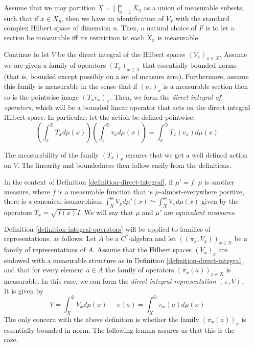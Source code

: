 \begin{example}
\label{example-measurable-Hilbert}
Assume that we may partition $X=\bigsqcup_{n=1}^{\omega} X_n$ as a union of measurable subsets, such that if $x\in X_n$, then we have an identification of $V_x$ with the standard complex Hilbert space of dimension $n$. Then, a natural choice of $F$ is to let a section be measurable iff its restriction to each $X_n$ is measurable.
\end{example}




\begin{definition} 
\label{definition-integral-operators}
Continue to let $V$ be the direct integral of the Hilbert spaces $(V_x)_{x\in X}$. Assume we are given a family of operators $(T_x)_{x\in X}$ that essentially bounded norms (that is, bounded except possibly on a set of measure zero). Furthermore, assume this family is measurable in the sense that if $(v_x)_x$ is a measurable section then so is the pointwise image $(T_xv_x)_x$. Then, we form the {\it direct integral of operators}, which will be a bounded linear operator that acts on the direct integral Hilbert space. In particular, let the action be defined pointwise:
\[\left(\int_x^{\oplus}T_x d\mu (x)\right)\left(\int_x^{\oplus}v_x d\mu (x)\right) = \int_x^{\oplus}T_x(v_x) d\mu (x)\]
\end{definition}

The measurability of the family $(T_x)_x$ ensures that we get a well defined action on $V$. The linearity and boundedness then follow easily from the definitions.


\begin{remark}
 \label{remark-equivalent-measures}
In the context of Definition \eqref{definition-direct-integral}, if $\mu' = f \cdot \mu$ is another measure, where $f$ is a measurable function that is $\mu$-almost-everywhere positive, there is a canonical isomorphism $\int_X^{\oplus} V_x d\mu' (x) \simeq \int_X^{\oplus} V_x d\mu (x)$ given by the operators $T_x = \sqrt{f(x)} I$. We will say that $\mu$ and $\mu'$ are {\it equivalent measures}.
\end{remark}




Definition \ref{definition-integral-operators} will be applied to families of representations, as follows: 
Let $A$ be a $C^*$-algebra and let $((\pi_x,V_x))_{x\in X}$ be a family of representations of $A$. Assume that the Hilbert spaces $(V_x)_x$ are endowed with a measurable structure as in Definition \ref{definition-direct-integral}, and that for every element $a\in A$ the family of operators $(\pi_x(a))_{x\in X}$ is measurable. In this case, we can form the {\it direct integral representation} $(\pi,V)$. It is given by
\[V = \int_X^\oplus V_x d\mu (x)\;\;\;\;\;\pi(a) = \int_X^{\oplus} \pi_x(a) d\mu (x)\]
The only concern with the above definition is whether the family $(\pi_x(a))_x$ is essentially bounded in norm. The following lemma assures us that this is the case.

